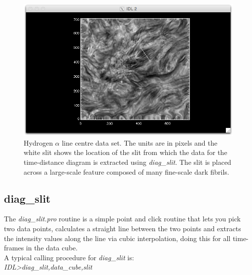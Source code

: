 \documentclass{article}
\begin{document}
\begin{figure}
\centering
\includegraphics[scale=0.6, clip=true, viewport=4.5cm 0.cm 20.cm 14.7cm]{slit_example2.png}  
\caption{Hydrogen $\alpha$ line centre data set. The units are in pixels and the white slit shows the location of the slit from which the data for the time-distance diagram is extracted using \textit{diag\_slit}. The slit is placed across a large-scale feature composed of many fine-scale dark fibrils.
}\label{fig:slit_pick}
\vspace{-10pt}
\end{figure}

\subsection{diag\_slit}
The \textit{diag\_slit.pro} routine is a simple point and click routine that lets you pick two data points, calculates a straight line between the
two points and extracts the intensity values along the line via cubic interpolation, doing this for all time-frames in the
data cube. \\

A typical calling procedure for \textit{diag\_slit} is:\\

\textit{IDL\textgreater diag\_slit,data\_cube,slit}\\
 
\end{document}
